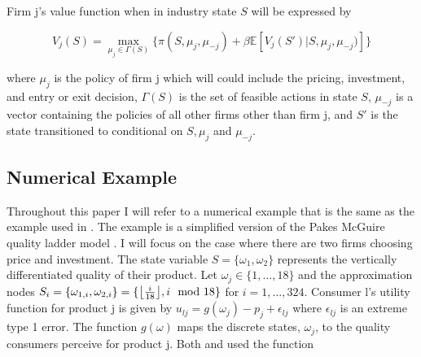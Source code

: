\documentclass[12pt]{article}
\DeclarePairedDelimiter\floor{\lfloor}{\rfloor}
\begin{document}

Firm j's value function when in industry state $S$ will be expressed by

\begin{equation*}
  V_j(S)=\max_{\mu_j \in \Gamma(S)} \{\pi(S, \mu_j, \mu_{-j}) + \beta\mathbb{E}[V_j(S')|S,\mu_{j},\mu_{-j})]\}
\end{equation*}

where $\mu_j$ is the policy of firm j which will could include the pricing, investment, and entry or exit decision, $\Gamma(S)$ is the set of feasible actions in state $S$, $\mu_{-j}$ is a vector containing the policies of all other firms other than firm j, and $S'$ is the state transitioned to conditional on $S,\mu_{j}$ and $\mu_{-j}$.

\subsection{Numerical Example}

Throughout this paper I will refer to a numerical example that is the same as the example used in \citet{2012_Doraszelski_Judd_QuanEcon}. The example is a simplified version of the Pakes McGuire quality ladder model \citep{2012_Doraszelski_Judd_QuanEcon}. I will focus on the case where there are two firms choosing price and investment. The state variable $S=\{\omega_1,\omega_2\}$ represents the vertically differentiated quality of their product. Let $\omega_j \in \{1, \dots ,18 \}$ and the approximation nodes $S_i=\{\omega_{1,i},\omega_{2,i}\}=\{\floor*{\frac{i}{18}},i \mod 18\}$ for $i=1,\dots,324$. Consumer l's utility function for product j is given by $u_{lj}=g(\omega_j) - p_j + \epsilon_{lj}$ where $\epsilon_{lj}$ is an extreme type 1 error. The function $g(\omega)$ maps the discrete states, $\omega_j$, to the quality consumers perceive for product j. Both \citet{1992_Pakes_McGuire_NBER} and \citet{2012_Doraszelski_Judd_QuanEcon} used the function
\end{document}

